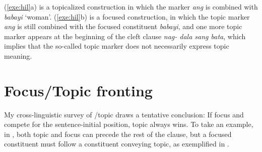 \noindent (\ref{exe:hil}a) is a topicalized construction in which the
 marker \textit{ang} is combined with \textit{babayi}
`woman'. (\ref{exe:hil}b) is a focused construction, in which the
topic marker \textit{ang} is still combined with the focused
constituent \textit{babayi}, and one more topic marker appears at the
beginning of the cleft clause \textit{nag- dala sang bata}, which
implies that the so-called topic marker does not necessarily express
topic meaning.


\section{Focus/Topic fronting}
\label{5:sec:fronting}
\largerpage[2]


My cross-linguistic survey of /topic  draws a
tentative conclusion: If focus and  compete for the
sentence-initial position, topic always wins.  To take an example, in
, both topic and focus can precede the rest of the clause,
but a focused constituent must follow a constituent conveying topic,
as exemplified in .



